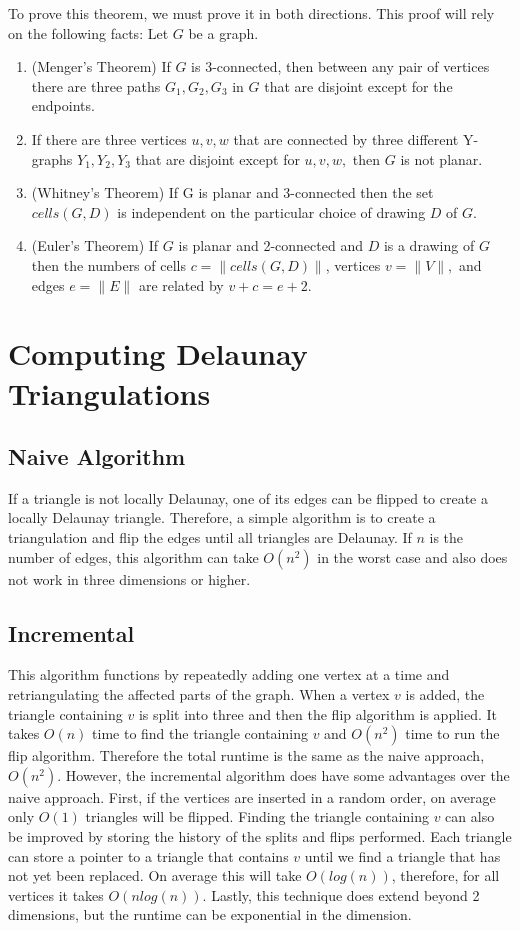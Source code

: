\documentclass[english]{article}
\begin{document}
 To prove this theorem, we must prove it in both directions. This proof will rely on the following facts:
 Let $G$ be a graph.
 \begin{enumerate}
 	\item (Menger's Theorem) If $G$ is 3-connected, then between any pair of vertices there are three paths $G_1, G_2, G_3$ in $G$ that are disjoint except for the endpoints.
	\item If there are three vertices $u,v,w$ that are connected by three different Y-graphs $Y_1, Y_2, Y_3$ that are disjoint except for $u,v,w,$ then $G$ is not planar.
	\item (Whitney's Theorem) If G is planar and 3-connected then the set $cells(G,D)$ is independent on the particular choice of drawing $D$ of $G$.
	\item (Euler's Theorem) If $G$ is planar and 2-connected and $D$ is a drawing of $G$ then the numbers of cells $c= \|cells(G,D)\|$, vertices $v = \|V\|,$ and edges $e = \|E\|$ are related by  $v+c = e+2$.
	
 \end{enumerate}

\section{Computing Delaunay Triangulations}
\subsection{Naive Algorithm}
If a triangle is not locally Delaunay, one of its edges can be flipped to create a locally Delaunay triangle. Therefore, a simple algorithm is to create a triangulation and flip the edges until all triangles are Delaunay. If $n$ is the number of edges, this algorithm can take $O(n^2)$ in the worst case and also does not work in three dimensions or higher.
\subsection{Incremental}
This algorithm  functions by repeatedly adding one vertex at a time and retriangulating the affected parts of the graph. When a vertex $v$ is added, the triangle containing $v$ is split into three and then the flip algorithm is applied. It takes $O(n)$ time to find the triangle containing $v$ and $O(n^2)$ time to run the flip algorithm. Therefore the total runtime is the same as the naive approach, $O(n^2)$. However, the incremental algorithm does have some advantages over the naive approach. First, if the vertices are inserted in a random order, on average only $O(1)$ triangles will be flipped. Finding the triangle containing $v$ can also be improved by storing the history of the splits and flips performed. Each triangle can store a pointer to a triangle that contains $v$ until we find a triangle that has not yet been replaced. On average this will take $O(log(n))$, therefore, for all vertices it takes $O(nlog(n))$. Lastly, this technique does extend beyond 2 dimensions, but the runtime can be exponential in the dimension. 
\end{document}
